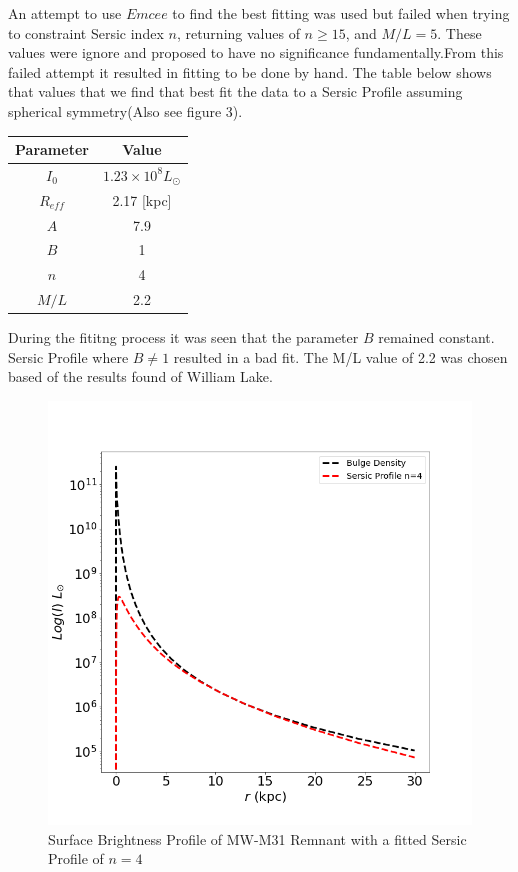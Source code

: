 \documentclass[iop]{emulateapj}
\begin{document}
An attempt to use $Emcee$ to find the best fitting was used but failed when trying to constraint Sersic index $n$, returning values of $n\geq15$, and $M/L=5$. These values were ignore and proposed to have no significance fundamentally.From this failed attempt it resulted in fitting to be done by hand. The table below shows that values that we find that best fit the data to a Sersic Profile assuming spherical symmetry(Also see figure 3).
  \begin{center}
    \begin{tabular}{ c  c  }
      \hline
      \hline
      Parameter & Value  \\ 
      \hline
      $I_{0}$ & $1.23 \times 10^{8}L_{\odot}$  \\ 
      $R_{eff}$ & 2.17 [kpc] \\
      $A$ & 7.9  \\
      $B$ & 1  \\
      $n$ & 4	 \\
      $M/L$ & 2.2 \\ 
      \hline
    \end{tabular}
  \end{center}
During the fititng process it was seen that the parameter $B$ remained constant. Sersic Profile where $B\neq1$ resulted in a bad fit. The M/L value of 2.2 was chosen based of the results found of William Lake. 
  \begin{figure}[h]
    \centering
    \includegraphics[width=\columnwidth]{sersic.png}
    \caption{Surface Brightness Profile of MW-M31 Remnant with a fitted Sersic Profile of $n=4$}
  \end{figure}
\end{document}

